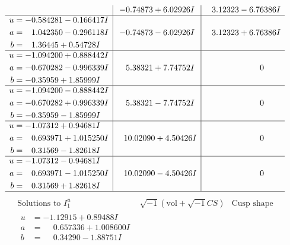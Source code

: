 \documentclass[1p]{elsarticle_modified}
\theoremstyle{definition}
\newcommand{\I}{\sqrt{-1}}
\begin{document}
$$\begin{array}{c|c|c}
 & -0.74873 + 6.02926 I & \phantom{-}3.12323 - 6.76386 I \\ \hline\begin{aligned}
u &= -0.584281 - 0.166417 I \\
a &= \phantom{-}1.042350 - 0.296118 I \\
b &= \phantom{-}1.36445 + 0.54728 I\end{aligned}
 & -0.74873 - 6.02926 I & \phantom{-}3.12323 + 6.76386 I \\ \hline\begin{aligned}
u &= -1.094200 + 0.888442 I \\
a &= -0.670282 - 0.996339 I \\
b &= -0.35959 + 1.85999 I\end{aligned}
 & \phantom{-}5.38321 + 7.74752 I & \phantom{-0.000000 } 0 \\ \hline\begin{aligned}
u &= -1.094200 - 0.888442 I \\
a &= -0.670282 + 0.996339 I \\
b &= -0.35959 - 1.85999 I\end{aligned}
 & \phantom{-}5.38321 - 7.74752 I & \phantom{-0.000000 } 0 \\ \hline\begin{aligned}
u &= -1.07312 + 0.94681 I \\
a &= \phantom{-}0.693971 + 1.015250 I \\
b &= \phantom{-}0.31569 - 1.82618 I\end{aligned}
 & \phantom{-}10.02090 + 4.50426 I & \phantom{-0.000000 } 0 \\ \hline\begin{aligned}
u &= -1.07312 - 0.94681 I \\
a &= \phantom{-}0.693971 - 1.015250 I \\
b &= \phantom{-}0.31569 + 1.82618 I\end{aligned}
 & \phantom{-}10.02090 - 4.50426 I & \phantom{-0.000000 } 0\\
 \hline 
 \end{array}$$\newpage$$\begin{array}{c|c|c}  
\text{Solutions to }I^u_{1}& \I (\text{vol} + \sqrt{-1}CS) & \text{Cusp shape}\\
 \hline 
\begin{aligned}
u &= -1.12915 + 0.89488 I \\
a &= \phantom{-}0.657336 + 1.008600 I \\
b &= \phantom{-}0.34290 - 1.88751 I\end{aligned}

\end{array}$$
\end{document}
